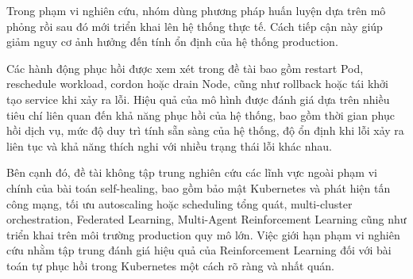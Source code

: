 Trong phạm vi nghiên cứu, nhóm dùng phương pháp huấn luyện dựa trên mô phỏng rồi sau đó mới triển khai lên hệ thống thực tế. Cách tiếp cận này giúp giảm nguy cơ ảnh hưởng đến tính ổn định của hệ thống production.

Các hành động phục hồi được xem xét trong đề tài bao gồm restart Pod, reschedule workload, cordon hoặc drain Node, cũng như rollback hoặc tái khởi tạo service khi xảy ra lỗi. Hiệu quả của mô hình được đánh giá dựa trên nhiều tiêu chí liên quan đến khả năng phục hồi của hệ thống, bao gồm thời gian phục hồi dịch vụ, mức độ duy trì tính sẵn sàng của hệ thống, độ ổn định khi lỗi xảy ra liên tục và khả năng thích nghi với nhiều trạng thái lỗi khác nhau.

Bên cạnh đó, đề tài không tập trung nghiên cứu các lĩnh vực ngoài phạm vi chính của bài toán self-healing, bao gồm bảo mật Kubernetes và phát hiện tấn công mạng, tối ưu autoscaling hoặc scheduling tổng quát, multi-cluster orchestration, Federated Learning, Multi-Agent Reinforcement Learning cũng như triển khai trên môi trường production quy mô lớn. Việc giới hạn phạm vi nghiên cứu nhằm tập trung đánh giá hiệu quả của Reinforcement Learning đối với bài toán tự phục hồi trong Kubernetes một cách rõ ràng và nhất quán.

